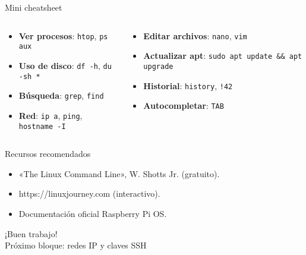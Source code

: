 \documentclass[aspectratio=169, professionalfonts]{beamer}
\begin{document}
\begin{frame}{Mini cheatsheet}
\begin{columns}[T]
\begin{column}{0.48\textwidth}
\begin{itemize}
  \item \textbf{Ver procesos}: \texttt{htop}, \texttt{ps aux}
  \item \textbf{Uso de disco}: \texttt{df -h}, \texttt{du -sh *}
  \item \textbf{Búsqueda}: \texttt{grep}, \texttt{find}
  \item \textbf{Red}: \texttt{ip a}, \texttt{ping}, \texttt{hostname -I}
\end{itemize}
\end{column}
\begin{column}{0.48\textwidth}
\begin{itemize}
  \item \textbf{Editar archivos}: \texttt{nano}, \texttt{vim}
  \item \textbf{Actualizar apt}: \texttt{sudo apt update && apt upgrade}
  \item \textbf{Historial}: \texttt{history}, \texttt{!42}
  \item \textbf{Autocompletar}: \texttt{TAB}
\end{itemize}
\end{column}
\end{columns}
\end{frame}

\begin{frame}{Recursos recomendados}
\begin{itemize}
  \item «The Linux Command Line», W. Shotts Jr. (gratuito).
  \item https://linuxjourney.com (interactivo).
  \item Documentación oficial Raspberry Pi OS.
\end{itemize}
\end{frame}

\begin{frame}[standout]
  ¡Buen trabajo!\\
  Próximo bloque: redes IP y claves SSH
\end{frame}
\end{document}
